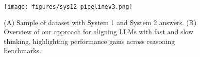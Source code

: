 \begin{figure}[t]
  \texttt{[image: figures/sys12-pipelinev3.png]}
  \caption{(A) Sample of dataset with System 1 and System 2 answers.
            (B) Overview of our approach for aligning LLMs with fast and slow thinking, highlighting performance gains across reasoning benchmarks.}
  \label{fig:overview}
\end{figure}

